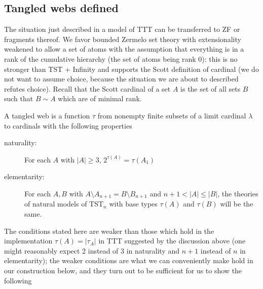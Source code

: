\documentclass[12pt]{article}
\begin{document}
\newpage

\subsection{Tangled webs defined}

The situation just described in a model of TTT can be transferred to ZF or fragments thereof.  We favor bounded Zermelo set theory with extensionality weakened to allow a set of atoms with the assumption that everything is
in a rank of the cumulative hierarchy (the set of atoms being rank 0):  this is no stronger than TST + Infinity and supports the Scott definition of cardinal (we do not want to assume choice, because the situation we are about to described refutes choice).  Recall that the Scott cardinal of a set $A$ is the set of all sets $B$ such that $B \sim A$ which are of minimal rank.

A tangled web is a function $\tau$ from nonempty finite subsets of a limit cardinal $\lambda$ to cardinals with the following properties

\begin{description}

\item[naturality:]  For each $A$ with $|A| \geq 3$, $2^{\tau(A)} = \tau(A_1)$

\item[elementarity:]  For each $A,B$ with $A\setminus A_{n+1} = B \setminus B_{n+1}$ and $n+1<|A|\leq |B|$, the theories of natural models of TST$_n$ with base types $\tau(A)$ and $\tau(B)$ will be the same.

\end{description}

The conditions stated here are weaker than those which hold in the implementation $\tau(A) = |\tau_A|$ in TTT suggested by the discussion above (one might reasonably expect 2 instead of 3 in naturality and $n+1$ instead of $n$ in elementarity);  the weaker conditions are what we can conveniently make hold in our construction below, and they turn out to be sufficient 
for us to show the following
\end{document}
